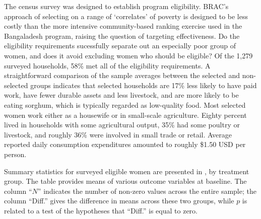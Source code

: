 \documentclass[11pt]{article}
\begin{document}
The census survey was designed to establish program eligibility.
BRAC's approach of selecting on a range of `correlates' of poverty
is designed to be less costly than the more intensive
community-based ranking exercise used in the Bangaladesh program,
raising the question of targeting effectiveness.  Do the eligibility
requirements sucessfully separate out an especially poor group of
women, and does it avoid excluding women who should be eligible? Of
the 1,279 surveyed households, 58\% met all of the eligibility
requirements.  A straightforward comparison of the sample averages
between the selected and non-selected groups indicates that selected
households are 17\% less likely to have paid work, have fewer
durable assets and less livestock, and are more likely to be eating
sorghum, which is typically regarded as low-quality food.  Most
selected women work either as a housewife or in small-scale
agriculture. Eighty percent lived in households with some
agricultural output, 35\% had some poultry or livestock, and roughly
36\% were involved in small trade or retail.  Average reported daily
consumption expenditures amounted to roughly \$1.50 USD per person.

Summary statistics for surveyed eligible women are presented in
, by treatment group.  The table provides
means of various outcome variables at baseline.  The column ``\(N\)''
indicates the number of non-zero values across the entire sample;
the column ``Diff.'' gives the difference in means across these two
groups, while \(p\) is related to a test of the hypotheses that
``Diff.'' is equal to zero.
\end{document}
